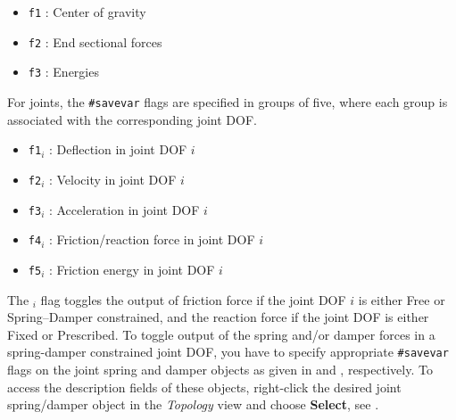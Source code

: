 \begin{itemize}
\item{\tt f1} : Center of gravity
\item{\tt f2} : End sectional forces
\item{\tt f3} : Energies
\end{itemize}

\clearpage



For joints, the {\tt\#savevar} flags are specified in groups of five,
where each group is associated with the corresponding joint DOF.


\begin{itemize}
\item{\tt f1$_i$} : Deflection in joint DOF $i$
\item{\tt f2$_i$} : Velocity in joint DOF $i$
\item{\tt f3$_i$} : Acceleration in joint DOF $i$
\item{\tt f4$_i$} : Friction/reaction force in joint DOF $i$
\item{\tt f5$_i$} : Friction energy in joint DOF $i$
\end{itemize}

\noindent
The {\tt{}$_i$} flag toggles the output of friction force if the
joint DOF $i$ is either Free or Spring--Damper constrained, and the reaction
force if the joint DOF is either Fixed or Prescribed.
To toggle output of the spring and/or damper forces in a spring-damper
constrained joint DOF, you have to specify appropriate
{\tt\#savevar} flags on the joint spring and damper objects as given in
 and , respectively.
To access the description fields of these objects, right-click the desired joint
spring/damper object in the {\sl Topology} view and choose \textbf{Select},
see .


